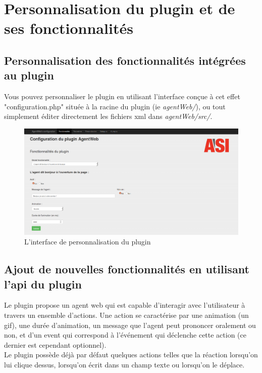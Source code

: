 \documentclass[11pt,dvipsnames,svgnames]{report}
\begin{document}
\chapter{Personnalisation du plugin et de ses fonctionnalités}

\section{Personnalisation des fonctionnalités intégrées au plugin}
   Vous pouvez personnaliser le plugin en utilisant l'interface conçue à cet effet "configuration.php" située à la racine du plugin (ie \textit{agentWeb/}), ou tout simplement éditer directement les fichiers xml dans \textit{agentWeb/src/}.\\
   
   
\begin{figure}[H]
\centerline{\includegraphics[width=1\textwidth]{images/conf.png}}
\caption{L'interface de personnalisation du plugin}
\end{figure}
   
 
\section{Ajout de nouvelles fonctionnalités en utilisant l'api du plugin}
   
   Le plugin propose un agent web qui est capable d’interagir avec l'utilisateur à travers un ensemble d'actions. Une action se caractérise par une animation (un gif), une durée d'animation, un message que l'agent peut prononcer oralement ou non, et d'un event  qui correspond à l’événement qui déclenche cette action (ce dernier est cependant optionnel).\\
   
   Le plugin possède déjà par défaut quelques actions telles que la réaction lorsqu'on lui clique dessus, lorsqu'on écrit dans un champ texte ou lorsqu'on le déplace.\\
   
\end{document}
